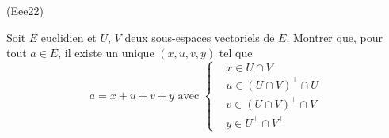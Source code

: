 \begin{tiny}(Eee22)\end{tiny} Soit $E$ euclidien et $U$, $V$ deux sous-espaces vectoriels de $E$. Montrer que, pour tout $a\in E$, il existe un unique $(x,u,v,y)$ tel que
\begin{displaymath}
 a=x+u+v+y\text{ avec }
\left\lbrace 
\begin{aligned}
 &x\in U\cap V\\
 &u\in (U\cap V)^\perp \cap U \\
 &v\in (U\cap V)^\perp \cap V \\
 &y\in U^\perp\cap V^\perp 
\end{aligned}
\right.
\end{displaymath}
 